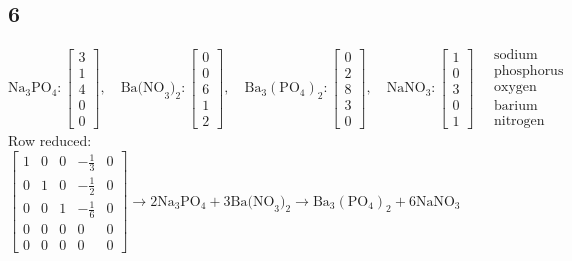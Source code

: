 \documentclass{article}
\begin{document}
\subsection*{6}
$ \text{Na}_3\text{PO}_4 :
\begin{bmatrix} 3 \\ 1 \\ 4 \\ 0 \\ 0 \end{bmatrix}, \quad
\text{Ba(NO}_3)_2 :
\begin{bmatrix} 0 \\ 0 \\ 6 \\ 1 \\ 2 \end{bmatrix}, \quad
\text{Ba}_3(\text{PO}_4)_2 :
\begin{bmatrix} 0 \\ 2 \\ 8 \\ 3 \\ 0 \end{bmatrix}, \quad
\text{NaNO}_3 :
\begin{bmatrix} 1 \\ 0 \\ 3 \\ 0 \\ 1 \end{bmatrix} \quad
\begin{array}{l}
\text{sodium} \\ \text{phosphorus} \\ \text{oxygen} \\ \text{barium} \\ \text{nitrogen}
\end{array} $
\\Row reduced: $\begin{bmatrix}
    1 & 0 & 0 & -\frac{1}{3} & 0 \\
    0 & 1 & 0 & -\frac{1}{2} & 0 \\
    0 & 0 & 1 & -\frac{1}{6} & 0 \\
    0 & 0 & 0 & 0 & 0 \\
    0 & 0 & 0 & 0 & 0
    \end{bmatrix} \rightarrow 2\text{Na}_3\text{PO}_4 + 3\text{Ba(NO}_3)_2 \rightarrow \text{Ba}_3(\text{PO}_4)_2 + 6\text{NaNO}_3$
\end{document}
